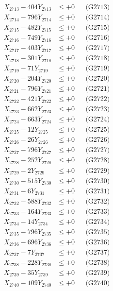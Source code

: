 \documentclass[a4paper,10pt]{article}
\begin{document}
{\begin{align}
X_{2713} - 404Y_{2713} &\leq +0 && \text{(G2713)} \\
X_{2714} - 796Y_{2714} &\leq +0 && \text{(G2714)} \\
X_{2715} - 482Y_{2715} &\leq +0 && \text{(G2715)} \\
X_{2716} - 749Y_{2716} &\leq +0 && \text{(G2716)} \\
X_{2717} - 403Y_{2717} &\leq +0 && \text{(G2717)} \\
X_{2718} - 301Y_{2718} &\leq +0 && \text{(G2718)} \\
X_{2719} - 71Y_{2719} &\leq +0 && \text{(G2719)} \\
X_{2720} - 204Y_{2720} &\leq +0 && \text{(G2720)} \\
\allowbreak
X_{2721} - 796Y_{2721} &\leq +0 && \text{(G2721)} \\
X_{2722} - 421Y_{2722} &\leq +0 && \text{(G2722)} \\
X_{2723} - 662Y_{2723} &\leq +0 && \text{(G2723)} \\
X_{2724} - 663Y_{2724} &\leq +0 && \text{(G2724)} \\
X_{2725} - 12Y_{2725} &\leq +0 && \text{(G2725)} \\
X_{2726} - 26Y_{2726} &\leq +0 && \text{(G2726)} \\
X_{2727} - 796Y_{2727} &\leq +0 && \text{(G2727)} \\
X_{2728} - 252Y_{2728} &\leq +0 && \text{(G2728)} \\
X_{2729} - 2Y_{2729} &\leq +0 && \text{(G2729)} \\
X_{2730} - 515Y_{2730} &\leq +0 && \text{(G2730)} \\
\allowbreak
X_{2731} - 6Y_{2731} &\leq +0 && \text{(G2731)} \\
X_{2732} - 588Y_{2732} &\leq +0 && \text{(G2732)} \\
X_{2733} - 164Y_{2733} &\leq +0 && \text{(G2733)} \\
X_{2734} - 14Y_{2734} &\leq +0 && \text{(G2734)} \\
X_{2735} - 796Y_{2735} &\leq +0 && \text{(G2735)} \\
X_{2736} - 696Y_{2736} &\leq +0 && \text{(G2736)} \\
X_{2737} - 7Y_{2737} &\leq +0 && \text{(G2737)} \\
X_{2738} - 228Y_{2738} &\leq +0 && \text{(G2738)} \\
X_{2739} - 35Y_{2739} &\leq +0 && \text{(G2739)} \\
X_{2740} - 109Y_{2740} &\leq +0 && \text{(G2740)} \\

\end{align}}
\end{document}

